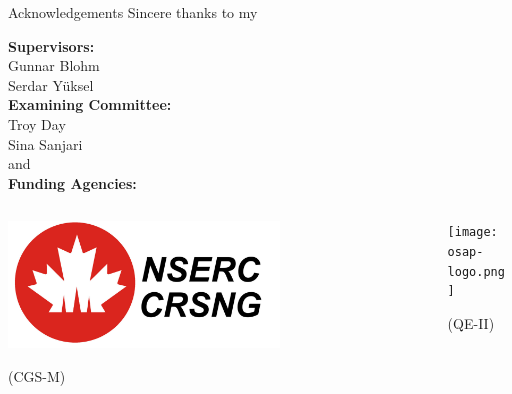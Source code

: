 \documentclass[8pt]{beamer}
\newcommand{\1}[1]{\mathbbm{1}_{\{#1\}}}
\begin{document}
\begin{frame}{Acknowledgements}
    Sincere thanks to my
    \begin{center}
        {\Large\textbf{Supervisors:}}\\[5pt]
        Gunnar Blohm\\[5pt]
        Serdar Y\"uksel\\[5pt]
        \vspace{10pt}
        {\Large\textbf{Examining Committee:}}\\[5pt]
        Troy Day\\[5pt]
        Sina Sanjari\\
        \vspace{10pt}
        and\\
        \vspace{10pt}
        {\Large\textbf{Funding Agencies:}}
    \end{center}
    \begin{columns}
        \begin{column}{0.5\textwidth}
            \begin{center}
                \includegraphics[width=0.65\textwidth]{nserc-logo.jpg}
            \end{center}
            \begin{center}
                (CGS-M)
            \end{center}
        \end{column}
        \begin{column}{0.5\textwidth}
            \begin{center}
                \texttt{[image: osap-logo.png]}
            \end{center}
            \begin{center}
                (QE-II)
            \end{center}
        \end{column}
    \end{columns}
\end{frame}
\end{document}
